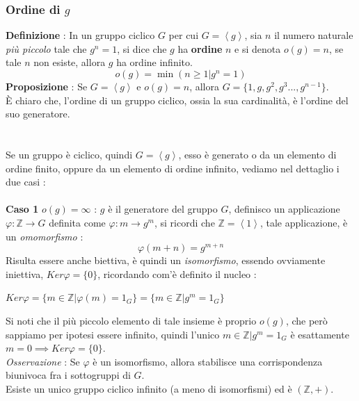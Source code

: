 \documentclass[12pt, letterpaper]{article}
\begin{document}
\subsubsection{Ordine di \(g\)}
\textbf{Definizione }: In un gruppo ciclico \(G\) per cui \(G=\left\langle g\right\rangle\),
sia \(n\) il numero naturale \textit{più piccolo}  tale che \(g^n=1\), si dice 
che \(g\) ha \textbf{ordine} \(n\) e si denota \(o(g)=n\), se tale \(n\) non esiste, allora \(g\) ha ordine infinito.
\begin{equation}
    o(g)=\min(n\ge 1|g^n=1)
\end{equation}
\textbf{Proposizione }: Se \(G=\left\langle g\right\rangle\) e \(o(g)=n\), allora 
\(G=\{1,g,g^2,g^3...,g^{n-1}\}\). \\
È chiaro che, l'ordine di un gruppo ciclico, ossia la sua cardinalità, è l'ordine del suo generatore.
\\\hphantom{}\\\hphantom{}\\
Se un gruppo è ciclico, quindi \(G=\left\langle g\right\rangle\), esso è generato 
o da un elemento di ordine finito, oppure da un elemento di ordine infinito, vediamo nel 
dettaglio i due casi :\\\hphantom{}\\
\textbf{Caso 1 }\( o(g)=\infty\) : \(g\) è il generatore del gruppo \(G\), definisco un applicazione 
\(\varphi : \mathbb{Z}\rightarrow G\) definita come \(\varphi : m \rightarrow g^m\), 
si ricordi che \(\mathbb{Z}=\left\langle1\right\rangle\), tale applicazione, 
è un \textit{omomorfismo} : \begin{equation}
    \varphi(m+n)=g^{m+n}
\end{equation}
Risulta essere anche biettiva, è quindi un \textit{isomorfismo}, essendo 
ovviamente iniettiva, \(Ker\varphi = \{0\}\), ricordando com'è definito 
il nucleo :
\begin{center} \(Ker\varphi = \{m\in \mathbb{Z}|\varphi(m)=1_G\}=\{m\in \mathbb{Z}|g^m=1_G\}\)\end{center} Si noti che il più piccolo 
elemento di tale insieme è proprio \(o(g)\), che però sappiamo per ipotesi 
essere infinito, quindi l'unico  \(m\in \mathbb{Z}|g^m=1_G\) è 
esattamente \(m=0\implies Ker\varphi = \{0\}\).\\
\textit{Osservazione }: Se \(\varphi\) è un isomorfismo, allora stabilisce una 
corrispondenza biunivoca fra i sottogruppi di \(G\).\\
Esiste un unico gruppo ciclico infinito (a meno di isomorfismi) ed è \((\mathbb{Z},+)\).
\end{document}
